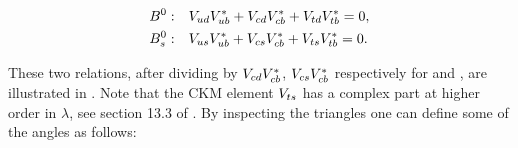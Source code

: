 \begin{subequations}
  \centering
  \label{unitConstraints}
  \begin{align}
    \Bd : & \quad \Vud\Vub^* + \Vcd\Vcb^* + \Vtd\Vtb^* = 0,
    \label{unitConstraints_Bd} \\
    \Bs : & \quad \Vus\Vub^* + \Vcs\Vcb^* + \Vts\Vtb^* = 0.
    \label{unitConstraints_Bs}
  \end{align}
\end{subequations}

\noindent These two relations, after dividing by $V_{cd}V_{cb}^*$, $V_{cs}V_{cb}^*$ respectively for \Bd and \Bs,
are illustrated in . Note that the CKM element $V_{ts}$ has a complex part at higher
order in $\lambda$, see section 13.3 of \cite{PDG}. By inspecting the triangles one can define some of the angles
as follows:

